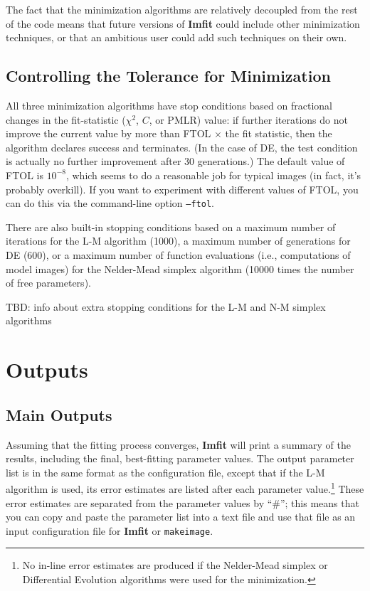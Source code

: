 \documentclass[10pt,a4paper,article]{memoir}
\newcommand{\imfit}{\textbf{Imfit}}
\newcommand{\makeimage}{\texttt{makeimage}}
\newcommand{\chisquare}{\ensuremath{\chi^{2}}}
\newcommand{\pmlr}{PMLR}
\begin{document}
\medskip

The fact that the minimization algorithms are relatively decoupled from the rest
of the code means that future versions of \imfit{} could include
other minimization techniques, or that an ambitious user could add such techniques
on their own.


\section{Controlling the Tolerance for Minimization}

All three minimization algorithms have stop conditions based on
fractional changes in the fit-statistic (\chisquare{}, $C$, or \pmlr)
value: if further iterations do not improve the current value by more
than FTOL $\times$ the fit statistic, then the algorithm declares success and
terminates. (In the case of DE, the test condition is actually no
further improvement after 30 generations.) The default value of FTOL is
$10^{-8}$, which seems to do a reasonable job for typical images (in
fact, it's probably overkill). If you want to experiment with different
values of FTOL, you can do this via the command-line option
\texttt{--ftol}.

There are also built-in stopping conditions based on a maximum number of
iterations for the L-M algorithm (1000), a maximum number of generations for DE
(600), or a maximum number of function evaluations (i.e., computations of model
images) for the Nelder-Mead simplex algorithm (10000 times the number of free
parameters).

TBD: info about extra stopping conditions for the L-M and N-M simplex algorithms




\chapter{Outputs}

\section{Main Outputs}

Assuming that the fitting process converges, \imfit{} will print a
summary of the results, including the final, best-fitting parameter
values. The output parameter list is in the same format as the
configuration file, except that if the L-M algorithm is used, its error
estimates are listed after each parameter value.\footnote{No in-line
error estimates are produced if the Nelder-Mead simplex or Differential
Evolution algorithms were used for the minimization.} These error
estimates are separated from the parameter values by ``\#''; this means
that you can copy and paste the parameter list into a text file and use
that file as an input configuration file for \imfit{} or \makeimage. 
\end{document}
